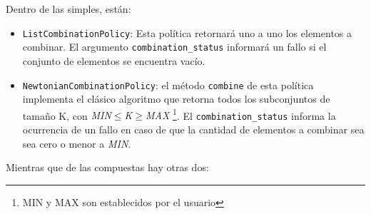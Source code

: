       	Dentro de las simples, est\'an:
      	\begin{itemize}
          \item \texttt{ListCombinationPolicy}\label{listCombPolicy}: Esta pol\'itica retornar\'a uno a uno los elementos a combinar. El argumento
            \texttt{combination\_status} informar\'a un fallo si el conjunto de elementos se encuentra vac\'io.
      		\item \texttt{NewtonianCombinationPolicy}: el m\'etodo \texttt{combine} de esta pol\'itica implementa el cl\'asico algoritmo que retorna
       			todos los subconjuntos de tama\~no K, con \emph{MIN$\leq$K$\geq$MAX} \footnote{MIN y MAX son establecidos por el usuario}. El \texttt{combination\_status} 
			informa la ocurrencia de un fallo en caso de que la cantidad de elementos a combinar sea sea cero o menor a \emph{MIN}.
       			
      	\end{itemize}
        Mientras que de las compuestas hay otras dos:\label{composedCombinationPolicies}
